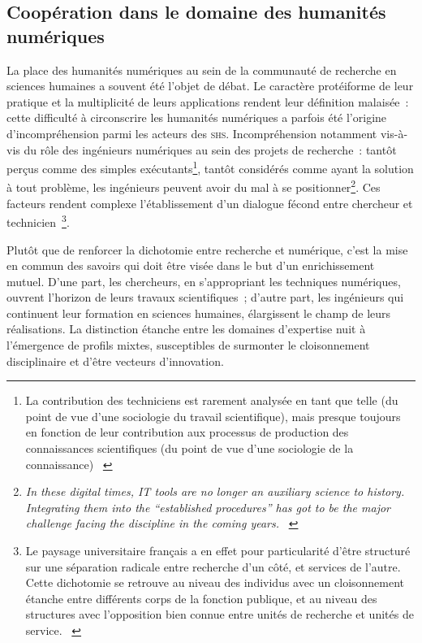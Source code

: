 \documentclass[a4paper,12pt,twoside]{book}
\newcommand{\eng}{\emph}
\newcommand{\shs}{\textsc{shs}\xspace}
\newcommand{\g}[1]{\og#1~\fg}
\begin{document}
		\subsection{Coopération dans le domaine des humanités numériques}
La place des humanités numériques au sein de la communauté de recherche en sciences humaines a souvent été l'objet de débat. Le caractère protéiforme de leur pratique et la multiplicité de leurs applications rendent leur définition malaisée~: cette difficulté à circonscrire les humanités numériques a parfois été l'origine d'incompréhension parmi les acteurs des \shs. Incompréhension notamment vis-à-vis du rôle des ingénieurs numériques au sein des projets de recherche~: tantôt perçus comme des simples exécutants\footnote{\g{La contribution des techniciens est rarement analysée en tant que telle (du point de vue d’une sociologie du travail scientifique), mais presque toujours en fonction de leur contribution aux processus de production des connaissances scientifiques (du point de vue d’une sociologie de la connaissance)} \cite[p.~163]{millerandScienceReseau2012}}, tantôt considérés comme ayant la solution à tout problème, les ingénieurs peuvent avoir du mal à se positionner\footnote{\g{\eng{In these digital times, IT tools are no longer an auxiliary science to history. Integrating them into the “established procedures” has got to be the major challenge facing the discipline in the coming years.}} \cite[§~40]{heimburgerHasHistorianCraft2012}}. Ces facteurs rendent complexe l'établissement d'un dialogue fécond entre chercheur et \g{technicien}\footnote{\g{Le paysage universitaire français a en effet pour particularité d’être structuré sur une séparation radicale entre recherche d’un côté, et services de l’autre. Cette dichotomie se retrouve au niveau des individus avec un cloisonnement étanche entre différents corps de la fonction publique, et au niveau des structures avec l’opposition bien connue entre unités de recherche et unités de service.} \cite[p.~44]{dacosEtatLieuxPositionnement2013}}.

Plutôt que de renforcer la dichotomie entre recherche et numérique, c'est la mise en commun des savoirs qui doit être visée dans le but d'un enrichissement mutuel. D'une part, les chercheurs, en s'appropriant les techniques numériques, ouvrent l'horizon de leurs travaux scientifiques~; d'autre part, les ingénieurs qui continuent leur formation en sciences humaines, élargissent le champ de leurs réalisations. La distinction étanche entre les domaines d'expertise nuit à l'émergence de profils mixtes, susceptibles de surmonter le cloisonnement disciplinaire et d'être vecteurs d'innovation.
\end{document}
